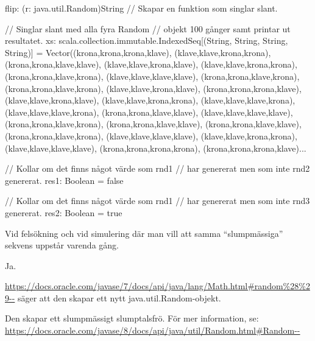 {\begin{REPL}
flip: (r: java.util.Random)String // Skapar en funktion som singlar slant.

  // Singlar slant med alla fyra Random
  // objekt 100 gånger samt printar ut resultatet.
xs: scala.collection.immutable.IndexedSeq[(String, String, String, String)] =
Vector((krona,krona,krona,klave), (klave,klave,krona,krona), (krona,krona,klave,klave),
(klave,klave,krona,klave), (klave,klave,krona,krona), (krona,krona,klave,krona),
(klave,klave,klave,klave), (krona,krona,klave,krona), (krona,krona,klave,krona),
(klave,klave,krona,klave), (krona,krona,krona,klave), (klave,klave,krona,klave),
(klave,klave,krona,krona), (klave,klave,klave,krona), (klave,klave,klave,krona),
(krona,krona,klave,klave), (klave,klave,klave,klave), (krona,krona,klave,krona),
(krona,krona,klave,klave), (krona,krona,klave,klave), (krona,krona,klave,krona),
(klave,klave,klave,klave), (klave,klave,krona,krona), (klave,klave,klave,klave),
(krona,krona,krona,krona), (krona,krona,krona,klave)...

  // Kollar om det finns något värde som rnd1
  // har genererat men som inte rnd2 genererat.
res1: Boolean = false

  // Kollar om det finns något värde som rnd1
  // har genererat men som inte rnd3 genererat.
res2: Boolean = true

\end{REPL}

\SubtaskSolved  Vid felsökning och vid simulering där man vill att samma “slumpmässiga” sekvens uppstår varenda gång.

\SubtaskSolved  Ja.

\SubtaskSolved  \url{https://docs.oracle.com/javase/7/docs/api/java/lang/Math.html#random%28%29--} säger att den skapar ett nytt java.util.Random-objekt.

\SubtaskSolved  Den skapar ett slumpmässigt slumptalsfrö. För mer information, se: \url{https://docs.oracle.com/javase/8/docs/api/java/util/Random.html#Random--}



\QUESTEND









\QUESTBEGIN

}
